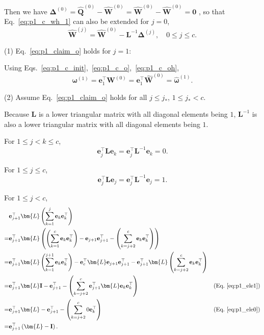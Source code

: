 \documentclass{article} %
\begin{document}
Then we have
$\bm{\Delta}^{(0)} = \hat{\bm{Q}}^{(0)} - \hat{\bm{W}}^{(0)} = \hat{\bm{W}}^{(0)} - \hat{\bm{W}}^{(0)} = \bm{0}$
, so that Eq.~\ref{eq:p1_c_wh_1} can also be extended for $j=0$,
\begin{equation}
\hat{\bm{W}}^{(j)} = \hat{\bm{W}}^{(0)} - \bm{L}^{-1} \bm{\Delta}^{(j)}, \quad 0 \le j \le c .
\label{eq:p1_c_wh}
\end{equation}

(1) Eq.~\ref{eq:p1_claim_o} holds for $j = 1$:

Using Eqs.~\ref{eq:p1_c_init},~\ref{eq:p1_c_o},~\ref{eq:p1_c_oh},
\begin{equation}
\bm{\omega}^{(1)}
= \mathbf{e}_{1}^\top \bm{W}^{(0)}
= \mathbf{e}_{1}^\top \hat{\bm{W}}^{(0)}
= \hat{\bm{\omega}}^{(1)}.
\label{eq:p1_j1}
\end{equation}

(2) Assume Eq.~\ref{eq:p1_claim_o} holds for all $j \le j_*$, $1 \le j_* < c$.

Because $\bm{L}$ is a lower triangular matrix with all diagonal elements being $1$, $\bm{L}^{-1}$ is also a lower triangular matrix with all diagonal elements being $1$.

For $1 \le j < k \le c$,
\begin{equation}
\mathbf{e}_{j}^\top \bm{L} \mathbf{e}_{k} = \mathbf{e}_{j}^\top \bm{L}^{-1} \mathbf{e}_{k} = 0 .
\label{eq:p1_ele0}
\end{equation}

For $1 \le j \le c$,
\begin{equation}
\mathbf{e}_{j}^\top \bm{L} \mathbf{e}_{j} = \mathbf{e}_{j}^\top \bm{L}^{-1} \mathbf{e}_{j} = 1 .
\label{eq:p1_ele1}
\end{equation}

For $1 \le j < c$,
\begin{equation}
\begin{aligned}
& \mathbf{e}_{j+1}^\top \bm{L} \left( \sum_{k=1}^{j} \mathbf{e}_{k} \mathbf{e}_{k}^\top \right) \\
= & \mathbf{e}_{j+1}^\top \bm{L} \left( \left( \sum_{k=1}^{c} \mathbf{e}_{k} \mathbf{e}_{k}^\top \right) - \mathbf{e}_{j+1} \mathbf{e}_{j+1}^\top - \left( \sum_{k=j+2}^{c} \mathbf{e}_{k} \mathbf{e}_{k}^\top \right) \right) \\
= & \mathbf{e}_{j+1}^\top \bm{L} \left( \sum_{k=1}^{j+1} \mathbf{e}_{k} \mathbf{e}_{k}^\top \right) - \mathbf{e}_{c}^\top \bm{L} \mathbf{e}_{j+1} \mathbf{e}_{j+1}^\top - \mathbf{e}_{j+1}^\top \bm{L} \left( \sum_{k=j+2}^{c} \mathbf{e}_{k} \mathbf{e}_{k}^\top \right) \\
= & \mathbf{e}_{j+1}^\top \bm{L} \mathbf{I} - \mathbf{e}_{j+1}^\top - \left( \sum_{k=j+2}^{c} \mathbf{e}_{j+1}^\top \bm{L} \mathbf{e}_{k} \mathbf{e}_{k}^\top \right) & \text{(Eq.~\ref{eq:p1_ele1})} \\
= & \mathbf{e}_{j+1}^\top \bm{L} - \mathbf{e}_{j+1}^\top - \left( \sum_{k=j+2}^{c} 0 \mathbf{e}_{k}^\top \right) & \text{(Eq.~\ref{eq:p1_ele0})} \\
= & \mathbf{e}_{j+1}^\top \left( \bm{L} - \mathbf{I} \right) .
\end{aligned}
\label{eq:p1_eli}
\end{equation}
\end{document}
